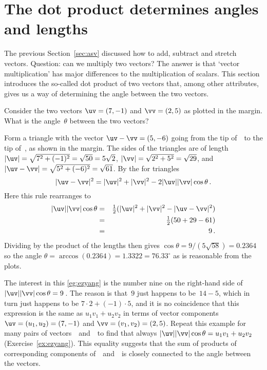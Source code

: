 
\section{The dot product determines angles and lengths}
\label{sec:dpdal}
\secttoc

The previous Section~\ref{sec:asv} discussed how to add, subtract and stretch vectors.
Question: can we multiply two vectors?
The answer is that `vector multiplication' has major differences to the multiplication of scalars.
This section introduces the so-called dot product of two vectors that, among other attributes, gives us a way of determining the angle between the two vectors.

\begin{example} \label{eg:ezyang}
Consider the two vectors \(\uv=(7,-1)\) and \(\vv=(2,5)\) as plotted in the margin.
\def\vecopsHook{\node[above] at (axis cs:0,0) {$\qquad\theta$};}
What is the angle~\(\theta\) between the two vectors?
\begin{solution} 
Form a triangle with the vector \(\uv-\vv=(5,-6)\) going from the tip of~\vv\ to the tip of~\uv, as shown in the margin.
%
The sides of the triangles are of length \(|\uv|=\sqrt{7^2+(-1)^2}=\sqrt{50}=5\sqrt2\), \(|\vv|=\sqrt{2^2+5^2}=\sqrt{29}\), and \(|\uv-\vv|=\sqrt{5^2+(-6)^2}=\sqrt{61}\).
By the  for triangles
\begin{equation*}
|\uv-\vv|^2=|\uv|^2+|\vv|^2-2|\uv||\vv|\cos\theta \,.
\end{equation*}
Here this rule rearranges to
\begin{eqnarray*}
|\uv||\vv|\cos\theta
&=&\tfrac12(|\uv|^2+|\vv|^2-|\uv-\vv|^2)
\\&=&\tfrac12(50+29-61)
\\&=&9\,.
\end{eqnarray*}
Dividing by the product of the lengths then gives \(\cos\theta=9/(5\sqrt{58})=0.2364\) so the angle \(\theta =\arccos(0.2364) =1.3322 =76.33^\circ\) as is reasonable from the plots.
\end{solution}
\end{example}

The interest in this \autoref{eg:ezyang} is the number nine on the right-hand side of \(|\uv||\vv|\cos\theta=9\)\,.  
The reason is that~\(9\) just happens to be~\(14-5\), which in turn just happens to be \(7\cdot2+(-1)\cdot5\), and it is no coincidence that this expression is the same as \(u_1v_1+u_2v_2\) in terms of vector components \(\uv=(u_1,u_2)=(7,-1)\) and \(\vv=(v_1,v_2)=(2,5)\).
Repeat this example for many pairs of vectors~\uv\ and~\vv\ to find that always \(|\uv||\vv|\cos\theta=u_1v_1+u_2v_2\) (Exercise~\ref{ex:ezyang}).
This equality suggests that the sum of products of corresponding components of~\uv\ and~\vv\ is closely connected to the angle between the vectors.


